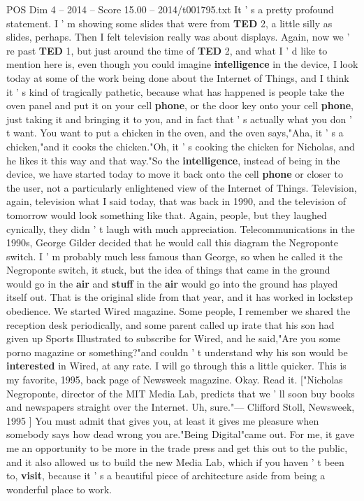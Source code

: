 \begin{textsample}{POS Dim 4 – 2014 – Score 15.00 – 2014/t001795.txt}
It ' s a pretty profound statement.
I ' m showing some slides that were from \textbf{TED} 2, a little silly as slides, perhaps.
Then I felt television really was about displays.
Again, now we ' re past \textbf{TED} 1, but just around the time of \textbf{TED} 2, and what I ' d like to mention here is, even though you could imagine \textbf{intelligence} in the device, I look today at some of the work being done about the Internet of Things, and I think it ' s kind of tragically pathetic, because what has happened is people take the oven panel and put it on your cell \textbf{phone}, or the door key onto your cell \textbf{phone}, just taking it and bringing it to you, and in fact that ' s actually what you don ' t want.
You want to put a chicken in the oven, and the oven says,"Aha, it ' s a chicken,"and it cooks the chicken."Oh, it ' s cooking the chicken for Nicholas, and he likes it this way and that way."So the \textbf{intelligence}, instead of being in the device, we have started today to move it back onto the cell \textbf{phone} or closer to the user, not a particularly enlightened view of the Internet of Things.
Television, again, television what I said today, that was back in 1990, and the television of tomorrow would look something like that.
Again, people, but they laughed cynically, they didn ' t laugh with much appreciation.
Telecommunications in the 1990s, George Gilder decided that he would call this diagram the Negroponte switch.
I ' m probably much less famous than George, so when he called it the Negroponte switch, it stuck, but the idea of things that came in the ground would go in the \textbf{air} and \textbf{stuff} in the \textbf{air} would go into the ground has played itself out.
That is the original slide from that year, and it has worked in lockstep obedience.
We started Wired magazine.
Some people, I remember we shared the reception desk periodically, and some parent called up irate that his son had given up Sports Illustrated to subscribe for Wired, and he said,"Are you some porno magazine or something?"and couldn ' t understand why his son would be \textbf{interested} in Wired, at any rate.
I will go through this a little quicker.
This is my favorite, 1995, back page of Newsweek magazine.
Okay.
Read it. ["Nicholas Negroponte, director of the MIT Media Lab, predicts that we ' ll soon buy books and newspapers straight over the Internet.
Uh, sure."— Clifford Stoll, Newsweek, 1995 ] You must admit that gives you, at least it gives me pleasure when somebody says how dead wrong you are."Being Digital"came out.
For me, it gave me an opportunity to be more in the trade press and get this out to the public, and it also allowed us to build the new Media Lab, which if you haven ' t been to, \textbf{visit}, because it ' s a beautiful piece of architecture aside from being a wonderful place to work.

\end{textsample}
